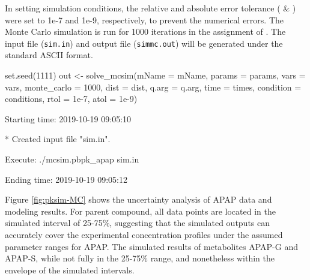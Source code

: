 In setting simulation conditions, the relative and absolute error
tolerance ( \& ) were set to 1e-7 and 1e-9,
respectively, to prevent the numerical errors. The Monte Carlo
simulation is run for 1000 iterations in the assignment of
. The input file (\texttt{sim.in}) and output file
(\texttt{simmc.out}) will be generated under the standard ASCII format.

\begin{Schunk}
\begin{Sinput}
set.seed(1111)
out <- solve_mcsim(mName = mName, params = params, vars = vars,
                   monte_carlo = 1000, dist = dist, q.arg = q.arg, 
                   time = times, condition = conditions, 
                   rtol = 1e-7, atol = 1e-9)
\end{Sinput}
\begin{Soutput}
  Starting time: 2019-10-19 09:05:10
\end{Soutput}
\begin{Soutput}
  * Created input file "sim.in".
\end{Soutput}
\begin{Soutput}
  Execute: ./mcsim.pbpk_apap sim.in
\end{Soutput}
\begin{Soutput}
  Ending time: 2019-10-19 09:05:12
\end{Soutput}
\end{Schunk}

Figure \ref{fig:pksim-MC} shows the uncertainty analysis of APAP data
and modeling results. For parent compound, all data points are located
in the simulated interval of 25-75\%, suggesting that the simulated
outputs can accurately cover the experimental concentration profiles
under the assumed parameter ranges for APAP. The simulated results of
metabolites APAP-G and APAP-S, while not fully in the 25-75\% range, and
nonetheless within the envelope of the simulated intervals.

